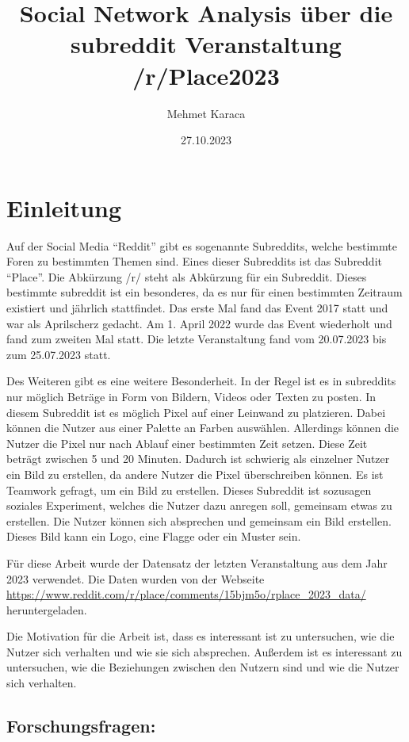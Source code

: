 \documentclass[
]{article}
\title{Social Network Analysis über die subreddit Veranstaltung
/r/Place2023}
\author{Mehmet Karaca}
\date{27.10.2023}
\begin{document}
\maketitle

{
\setcounter{tocdepth}{2}
\tableofcontents
}
\section{Einleitung}\label{sec-einleitung}

Auf der Social Media ``Reddit'' gibt es sogenannte Subreddits, welche
bestimmte Foren zu bestimmten Themen sind. Eines dieser Subreddits ist
das Subreddit ``Place''. Die Abkürzung /r/ steht als Abkürzung für ein
Subreddit. Dieses bestimmte subreddit ist ein besonderes, da es nur für
einen bestimmten Zeitraum existiert und jährlich stattfindet. Das erste
Mal fand das Event 2017 statt und war als Aprilscherz gedacht. Am 1.
April 2022 wurde das Event wiederholt und fand zum zweiten Mal statt.
Die letzte Veranstaltung fand vom 20.07.2023 bis zum 25.07.2023 statt.

Des Weiteren gibt es eine weitere Besonderheit. In der Regel ist es in
subreddits nur möglich Beträge in Form von Bildern, Videos oder Texten
zu posten. In diesem Subreddit ist es möglich Pixel auf einer Leinwand
zu platzieren. Dabei können die Nutzer aus einer Palette an Farben
auswählen. Allerdings können die Nutzer die Pixel nur nach Ablauf einer
bestimmten Zeit setzen. Diese Zeit beträgt zwischen 5 und 20 Minuten.
Dadurch ist schwierig als einzelner Nutzer ein Bild zu erstellen, da
andere Nutzer die Pixel überschreiben können. Es ist Teamwork gefragt,
um ein Bild zu erstellen. Dieses Subreddit ist sozusagen soziales
Experiment, welches die Nutzer dazu anregen soll, gemeinsam etwas zu
erstellen. Die Nutzer können sich absprechen und gemeinsam ein Bild
erstellen. Dieses Bild kann ein Logo, eine Flagge oder ein Muster sein.

Für diese Arbeit wurde der Datensatz der letzten Veranstaltung aus dem
Jahr 2023 verwendet. Die Daten wurden von der Webseite
\url{https://www.reddit.com/r/place/comments/15bjm5o/rplace_2023_data/}
heruntergeladen.

Die Motivation für die Arbeit ist, dass es interessant ist zu
untersuchen, wie die Nutzer sich verhalten und wie sie sich absprechen.
Außerdem ist es interessant zu untersuchen, wie die Beziehungen zwischen
den Nutzern sind und wie die Nutzer sich verhalten.

\subsection{Forschungsfragen:}\label{forschungsfragen}
\end{document}

